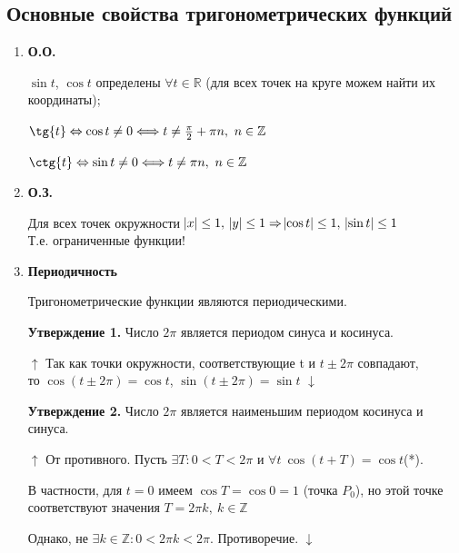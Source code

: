 \documentclass{article}
\begin{document}
      	\subsection{Основные свойства тригонометрических функций}
        
        \begin{enumerate}
        	\item \textbf{О.О.} 
          	
            \(\sin{t}\), \(\cos{t}\) определены \(\forall t \in \mathbb{R}\) (для всех точек на круге можем найти их координаты);
            
            \(\tg{t} \Leftrightarrow \cos{t} \not = 0 \Longleftrightarrow t \not = \frac{\pi}{2} + \pi n,\ n \in \mathbb{Z}\)

			\(\ctg{t} \Leftrightarrow \sin{t} \not = 0 \Longleftrightarrow t \not = \pi n,\ n \in \mathbb{Z}\)
            
            \item \textbf{О.З.}
            
            Для всех точек окружности \(\abs{x} \leq 1,\ \abs{y} \leq 1 \Rightarrow \abs{\cos{t}} \leq 1,\ \abs{\sin{t}} \leq 1\)
            \\Т.е. ограниченные функции!
            
            \item \textbf{Периодичность}
            
            Тригонометрические функции являются периодическими.
            
            \textbf{Утверждение 1.} Число \(2 \pi\) является периодом синуса и косинуса.
            
            \(\uparrow\) Так как точки окружности, соответствующие t и \(t \pm 2 \pi\) совпадают,\\
            то \(\cos{(t \pm 2 \pi)} = \cos{t}\), \(\sin{(t \pm 2 \pi)} = \sin{t}\) \(\downarrow\)
        
            \textbf{Утверждение 2.} Число \(2 \pi\) является наименьшим периодом косинуса и синуса.
            
            \(\uparrow\) От противного. Пусть \(\exists T: 0 < T < 2 \pi\) и \(\forall t \ \cos{(t+T)} = \cos{t}\)(*).
            
            В частности, для \(t=0\) имеем \(\cos{T} = \cos{0} = 1\) (точка \(P_0\)), но этой точке соответствуют значения \(T = 2 \pi k, \ k \in \mathbb{Z}\)
            
            Однако, не \(\exists k \in \mathbb{Z}: 0 < 2 \pi k < 2 \pi\). Противоречие. \(\downarrow\)
            

\end{enumerate}
\end{document}
